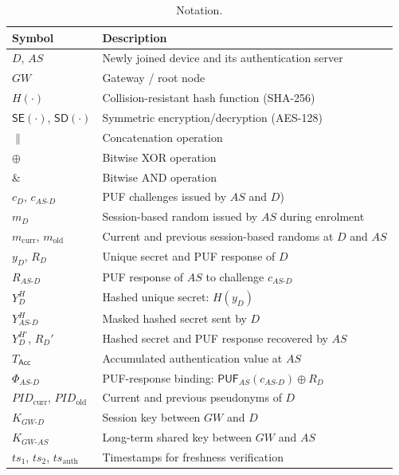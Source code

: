 \documentclass[conference]{IEEEtran}
\makeatletter
\newcommand{\onelinetablecaption}{%
  \long\def\@makecaption##1##2{%
    \footnotesize\bgroup\par\centering\@IEEEtabletopskipstrut
    \setbox\@tempboxa\hbox{%
      \normalfont\footnotesize ##1\quad\scshape ##2}%
    \ifdim\wd\@tempboxa>\hsize
      \parbox{\hsize}{\centering\normalfont\footnotesize ##1\quad\scshape ##2}%
    \else
      \box\@tempboxa
    \fi
    \par
    \addvspace{0.5\baselineskip}\egroup
    \@IEEEtablecaptionsepspace}}
\makeatother
\begin{document}
\begin{table}[!t]
  \centering
  \onelinetablecaption
  \caption{Notation.}
  \label{tab:notations}
  \scriptsize
  \setlength{\tabcolsep}{4pt}
  \begin{tabular}{ll}
    \toprule
    Symbol & Description \\
    \midrule
    $D$, $AS$ & Newly joined device and its authentication server \\
    $GW$ & Gateway / root node \\
    $H(\cdot)$ & Collision-resistant hash function (SHA-256) \\
    $\mathsf{SE}(\cdot)$, $\mathsf{SD}(\cdot)$ & Symmetric encryption/decryption (AES-128) \\
    $\|$ & Concatenation operation \\
    $\oplus$ & Bitwise XOR operation \\
    $\mathbin{\&}$ & Bitwise AND operation \\
    $c_D$, $c_{AS\text{-}D}$ & PUF challenges issued by $AS$ and $D$) \\
    $m_D$ & Session-based random issued by $AS$ during enrolment \\
    $m_{\mathrm{curr}}$, $m_{\mathrm{old}}$ & Current and previous session-based randoms at $D$ and $AS$ \\
    $y_D$, $R_D$ & Unique secret and PUF response of $D$ \\
    $R_{AS\text{-}D}$ & PUF response of $AS$ to challenge $c_{AS\text{-}D}$ \\
    $Y_D^H$ & Hashed unique secret: $H(y_D)$ \\
    $Y_{AS\text{-}D}^H$ & Masked hashed secret sent by $D$\\
    $Y_D^{H'}$, $R_D'$ & Hashed secret and PUF response recovered by $AS$ \\
    $T_\mathsf{Acc}$ & Accumulated authentication value at $AS$ \\
    $\Phi_{AS\text{-}D}$ & PUF-response binding: $\mathsf{PUF}_{AS}(c_{AS\text{-}D}) \oplus R_D$ \\
    $\mathit{PID}_{\mathrm{curr}}$, $\mathit{PID}_{\mathrm{old}}$ & Current and previous pseudonyms of $D$ \\
    $K_{GW\text{-}D}$ & Session key between $GW$ and $D$ \\
    $K_{GW\text{-}AS}$ & Long-term shared key between $GW$ and $AS$ \\
    $ts_1$, $ts_2$, $ts_{\mathrm{auth}}$ & Timestamps for freshness verification \\
    \bottomrule
  \end{tabular}
\end{table}
\end{document}
